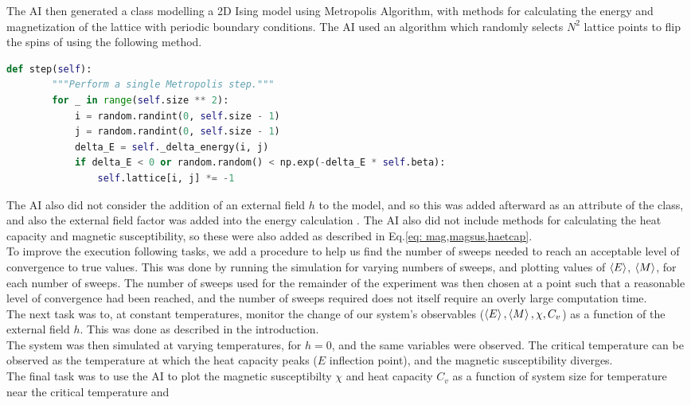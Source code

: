 \documentclass{article}
\theoremstyle{definition}
\theoremstyle{remark}
\begin{document}
The AI then generated a class modelling a 2D Ising model using Metropolis Algorithm, with methods for calculating the energy and magnetization of the lattice with periodic boundary conditions. The AI used an algorithm which randomly selects $N^2$ lattice points to flip the spins of using the following method.
\begin{lstlisting}[language=Python]
    def step(self):
        """Perform a single Metropolis step."""
        for _ in range(self.size ** 2):
            i = random.randint(0, self.size - 1)
            j = random.randint(0, self.size - 1)
            delta_E = self._delta_energy(i, j)
            if delta_E < 0 or random.random() < np.exp(-delta_E * self.beta):
                self.lattice[i, j] *= -1
\end{lstlisting}
The AI also did not consider the addition of an external field $h$ to the model, and so this was added afterward as an attribute of the class, and also the external field factor was added into the energy calculation . The AI also did not include methods for calculating the heat capacity and magnetic susceptibility, so these were also added as described in Eq.\ref{eq: mag,magsus,haetcap}.\\
\indent To improve the execution following tasks, we add a procedure to help us find the number of sweeps needed to reach an acceptable level of convergence to true values. This was done by running the simulation for varying numbers of sweeps, and plotting values of $\braket{E}$, $\braket{M}$, for each number of sweeps. The number of sweeps used for the remainder of the experiment was then chosen at a point such that a reasonable level of convergence had been reached, and the number of sweeps required does not itself require an overly large computation time.\\ 
\indent The next task was to, at constant temperatures, monitor the change of our system's observables ($\braket{E},\braket{M},\chi,C_v$) as a function of the external field $h$. This was done as described in the introduction.\\
\indent The system was then simulated at varying temperatures, for $h=0$, and the same variables were observed. The critical temperature can be observed as the temperature at which the heat capacity peaks ($E$ inflection point), and the magnetic susceptibility diverges.\\
\indent The final task was to use the AI to plot the magnetic susceptibilty $\chi$ and heat capacity $C_v$ as a function of system size for temperature near the critical temperature and 
\end{document}
